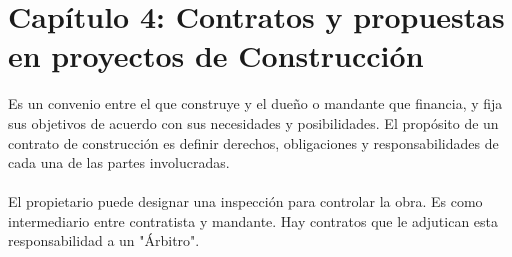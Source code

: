 \documentclass{article} %
\begin{document}
\newpage
\section{Capítulo 4: Contratos y propuestas en proyectos de Construcción}

Es un convenio entre el que construye y el dueño o mandante que financia, y fija sus objetivos
de acuerdo con sus necesidades y posibilidades. El propósito de un contrato de construcción
es definir derechos, obligaciones y responsabilidades de cada una de las partes involucradas.
\\ \\
El propietario puede designar una inspección para controlar la obra. Es como intermediario entre
contratista y mandante. Hay contratos que le adjutican esta responsabilidad a un "Árbitro".
\end{document}
